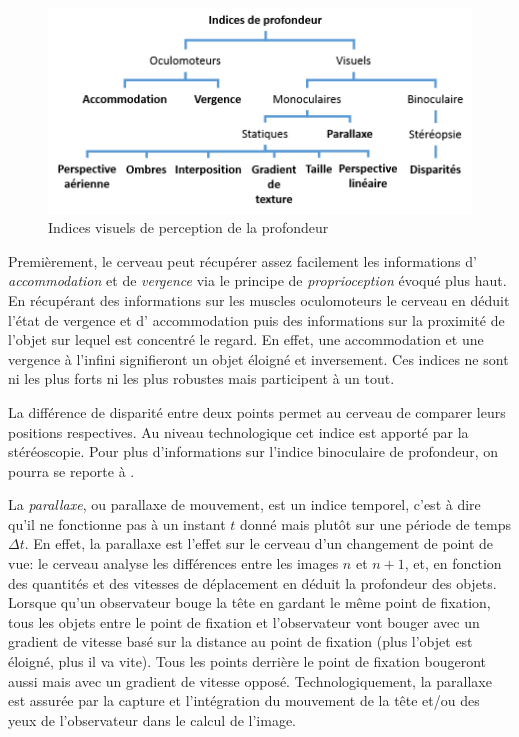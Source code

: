 	\begin{figure}
		\centering
		\includegraphics[scale=1]{Figures/IndicesProfondeur}
		\caption{Indices visuels de perception de la profondeur}
		\label{fig:indices_profondeur}
	\end{figure}
	
	\par Premièrement, le cerveau peut récupérer assez facilement les informations d' \textit{accommodation} et de \textit{vergence} via le principe de \textit{proprioception} évoqué plus haut. En récupérant des informations sur les muscles oculomoteurs le cerveau en déduit l'état de vergence et d' accommodation puis des informations sur la proximité de l'objet sur lequel est concentré le regard. En effet, une accommodation et une vergence à l'infini signifieront un objet éloigné et inversement. Ces indices ne sont ni les plus forts ni les plus robustes mais participent à un tout.
	
	\par La différence de disparité entre deux points permet au cerveau de comparer leurs positions respectives. Au niveau technologique cet indice est apporté par la stéréoscopie. Pour plus d'informations sur l'indice binoculaire de profondeur, on pourra se reporte à \citep{glassner_principles_1995}.
	
	\par La \textit{parallaxe}, ou parallaxe de mouvement, est un indice temporel, c'est à dire qu'il ne fonctionne pas à un instant $t$ donné mais plutôt sur une période de temps $\Delta t$. En effet, la parallaxe est l'effet sur le cerveau d'un changement de point de vue: le cerveau analyse les différences entre les images $n$ et $n+1$, et, en fonction des quantités et des vitesses de déplacement en déduit la profondeur des objets. Lorsque qu'un observateur bouge la tête en gardant le même point de fixation, tous les objets entre le point de fixation et l'observateur vont bouger avec un gradient de vitesse basé sur la distance au point de fixation (plus l'objet est éloigné, plus il va vite). Tous les points derrière le point de fixation bougeront aussi mais avec un gradient de vitesse opposé. Technologiquement, la parallaxe est assurée par la capture et l'intégration du mouvement de la tête et/ou des yeux de l'observateur dans le calcul de l'image.
	
